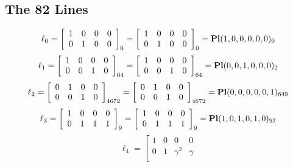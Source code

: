\documentclass{article}
\begin{document}
{\subsection*{The 82 Lines}
$$
\ell_{0} = 
\left[
\begin{array}{*{4}{r}}
1 & 0 & 0 & 0\\
0 & 1 & 0 & 0\\
\end{array}
\right]
_{0}
=
\left[
\begin{array}{*{4}c}
1  & 0  & 0  & 0\\
0  & 1  & 0  & 0\\
\end{array}
\right]_{0}
={\rm\bf Pl}(1,0,0,0,0,0 )_{0}$$
$$
\ell_{1} = 
\left[
\begin{array}{*{4}{r}}
1 & 0 & 0 & 0\\
0 & 0 & 1 & 0\\
\end{array}
\right]
_{64}
=
\left[
\begin{array}{*{4}c}
1  & 0  & 0  & 0\\
0  & 0  & 1  & 0\\
\end{array}
\right]_{64}
={\rm\bf Pl}(0,0,1,0,0,0 )_{2}$$
$$
\ell_{2} = 
\left[
\begin{array}{*{4}{r}}
0 & 1 & 0 & 0\\
0 & 0 & 1 & 0\\
\end{array}
\right]
_{4672}
=
\left[
\begin{array}{*{4}c}
0  & 1  & 0  & 0\\
0  & 0  & 1  & 0\\
\end{array}
\right]_{4672}
={\rm\bf Pl}(0,0,0,0,0,1 )_{649}$$
$$
\ell_{3} = 
\left[
\begin{array}{*{4}{r}}
1 & 0 & 0 & 0\\
0 & 1 & 1 & 1\\
\end{array}
\right]
_{9}
=
\left[
\begin{array}{*{4}c}
1  & 0  & 0  & 0\\
0  & 1  & 1  & 1\\
\end{array}
\right]_{9}
={\rm\bf Pl}(1,0,1,0,1,0 )_{97}$$
$$
\ell_{4} = 
\left[
\begin{array}{*{4}{r}}
1 & 0 & 0 & 0\\
0 & 1 & \gamma^{2} & \gamma \\
\end{array}
$$}
\end{document}
